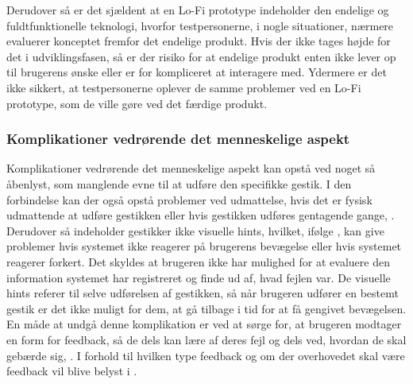 Derudover så er det sjældent at en Lo-Fi prototype indeholder den endelige og fuldtfunktionelle teknologi, hvorfor testpersonerne, i nogle situationer, nærmere evaluerer konceptet fremfor det endelige produkt. Hvis der ikke tages højde for det i udviklingsfasen, så er der risiko for at endelige produkt enten ikke lever op til brugerens ønske eller er for kompliceret at interagere med. Ydermere er det ikke sikkert, at testpersonerne oplever de samme problemer ved en Lo-Fi prototype, som de ville gøre ved det færdige produkt.   
%
\subsubsection{Komplikationer vedrørende det menneskelige aspekt}
\label{KomplikationerVedroerendeDetMenneskelige}
%
Komplikationer vedrørende det menneskelige aspekt kan opstå ved noget så åbenlyst, som manglende evne til at udføre den specifikke gestik. I den forbindelse kan der også opstå problemer ved udmattelse, hvis det er fysisk udmattende at udføre gestikken eller hvis gestikken udføres gentagende gange, \parencite[s. 28]{PDF:ATaxonomyOfGestures}. Derudover så indeholder gestikker ikke visuelle hints, hvilket, ifølge \textcite[s. 6]{PDF:NaturalUserInterfaces}, kan give problemer hvis systemet ikke reagerer på brugerens bevægelse eller hvis systemet reagerer forkert. Det skyldes at brugeren ikke har mulighed for at evaluere den information systemet har registreret og finde ud af, hvad fejlen var. De visuelle hints referer til selve udførelsen af gestikken, så når brugeren udfører en bestemt gestik er det ikke muligt for dem, at gå tilbage i tid for at få gengivet bevægelsen. En måde at undgå denne komplikation er ved at sørge for, at brugeren modtager en form for feedback, så de dels kan lære af deres fejl og dels ved, hvordan de skal gebærde sig, \parencite[s. 10]{PDF:NaturalUserInterfaces}. I forhold til hvilken type feedback og om der overhovedet skal være feedback vil blive belyst i . \blankline
%
